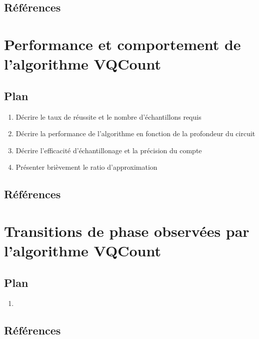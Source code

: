 \subsection*{Références}



\section{Performance et comportement de l'algorithme VQCount}

\subsection*{Plan}

\begin{enumerate}
    \item  Décrire le taux de réussite et le nombre d'échantillons requis
    \item  Décrire la performance de l'algorithme en fonction de la profondeur du circuit
    \item Décrire l'efficacité d'échantillonage et la précision du compte
    \item Présenter brièvement le ratio d'approximation
\end{enumerate}

\subsection*{Références}


\section{Transitions de phase observées par l'algorithme VQCount}

\subsection*{Plan}

\begin{enumerate}
    \item 
\end{enumerate}

\subsection*{Références}


